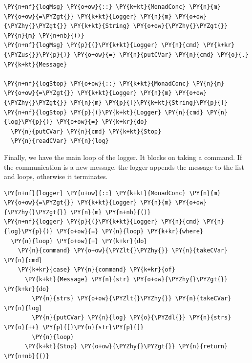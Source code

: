\begin{Verbatim}[commandchars=\\\{\}]
\PY{n+nf}{logMsg} \PY{o+ow}{::} \PY{k+kt}{MonadConc} \PY{n}{m} \PY{o+ow}{=\PYZgt{}} \PY{k+kt}{Logger} \PY{n}{m} \PY{o+ow}{\PYZhy{}\PYZgt{}} \PY{k+kt}{String} \PY{o+ow}{\PYZhy{}\PYZgt{}} \PY{n}{m} \PY{n+nb}{()}
\PY{n+nf}{logMsg} \PY{p}{(}\PY{k+kt}{Logger} \PY{n}{cmd} \PY{k+kr}{\PYZus{}}\PY{p}{)} \PY{o+ow}{=} \PY{n}{putCVar} \PY{n}{cmd} \PY{o}{.} \PY{k+kt}{Message}

\PY{n+nf}{logStop} \PY{o+ow}{::} \PY{k+kt}{MonadConc} \PY{n}{m} \PY{o+ow}{=\PYZgt{}} \PY{k+kt}{Logger} \PY{n}{m} \PY{o+ow}{\PYZhy{}\PYZgt{}} \PY{n}{m} \PY{p}{[}\PY{k+kt}{String}\PY{p}{]}
\PY{n+nf}{logStop} \PY{p}{(}\PY{k+kt}{Logger} \PY{n}{cmd} \PY{n}{log}\PY{p}{)} \PY{o+ow}{=} \PY{k+kr}{do}
  \PY{n}{putCVar} \PY{n}{cmd} \PY{k+kt}{Stop}
  \PY{n}{readCVar} \PY{n}{log}
\end{Verbatim}

Finally, we have the main loop of the logger. It blocks on taking a
command. If the communication is a new message, the logger appends the
message to the list and loops, otherwise it terminates.


\begin{Verbatim}[commandchars=\\\{\}]
\PY{n+nf}{logger} \PY{o+ow}{::} \PY{k+kt}{MonadConc} \PY{n}{m} \PY{o+ow}{=\PYZgt{}} \PY{k+kt}{Logger} \PY{n}{m} \PY{o+ow}{\PYZhy{}\PYZgt{}} \PY{n}{m} \PY{n+nb}{()}
\PY{n+nf}{logger} \PY{p}{(}\PY{k+kt}{Logger} \PY{n}{cmd} \PY{n}{log}\PY{p}{)} \PY{o+ow}{=} \PY{n}{loop} \PY{k+kr}{where}
  \PY{n}{loop} \PY{o+ow}{=} \PY{k+kr}{do}
    \PY{n}{command} \PY{o+ow}{\PYZlt{}\PYZhy{}} \PY{n}{takeCVar} \PY{n}{cmd}
    \PY{k+kr}{case} \PY{n}{command} \PY{k+kr}{of}
      \PY{k+kt}{Message} \PY{n}{str} \PY{o+ow}{\PYZhy{}\PYZgt{}} \PY{k+kr}{do}
        \PY{n}{strs} \PY{o+ow}{\PYZlt{}\PYZhy{}} \PY{n}{takeCVar} \PY{n}{log}
        \PY{n}{putCVar} \PY{n}{log} \PY{o}{\PYZdl{}} \PY{n}{strs} \PY{o}{++} \PY{p}{[}\PY{n}{str}\PY{p}{]}
        \PY{n}{loop}
      \PY{k+kt}{Stop} \PY{o+ow}{\PYZhy{}\PYZgt{}} \PY{n}{return} \PY{n+nb}{()}
\end{Verbatim}


